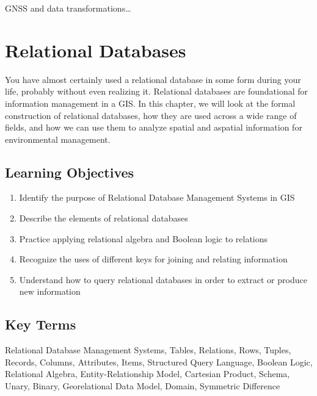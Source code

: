 \documentclass[
]{book}
\providecommand{\tightlist}{%
  \setlength{\itemsep}{0pt}\setlength{\parskip}{0pt}}
\begin{document}
GNSS and data transformations\ldots{}

\hypertarget{relational-databases}{%
\chapter{Relational Databases}\label{relational-databases}}

You have almost certainly used a relational database in some form during your life, probably without even realizing it. Relational databases are foundational for information management in a GIS. In this chapter, we will look at the formal construction of relational databases, how they are used across a wide range of fields, and how we can use them to analyze spatial and aspatial information for environmental management.

\hypertarget{learning-objectives-4}{%
\section*{Learning Objectives}\label{learning-objectives-4}}

\begin{enumerate}
\def\labelenumi{\arabic{enumi}.}
\tightlist
\item
  Identify the purpose of Relational Database Management Systems in GIS
\item
  Describe the elements of relational databases
\item
  Practice applying relational algebra and Boolean logic to relations
\item
  Recognize the uses of different keys for joining and relating information
\item
  Understand how to query relational databases in order to extract or produce new information
\end{enumerate}

\hypertarget{key-terms-4}{%
\section*{Key Terms}\label{key-terms-4}}

Relational Database Management Systems, Tables, Relations, Rows, Tuples, Records, Columns, Attributes, Items, Structured Query Language, Boolean Logic, Relational Algebra, Entity-Relationship Model, Cartesian Product, Schema, Unary, Binary, Georelational Data Model, Domain, Symmetric Difference
\end{document}
